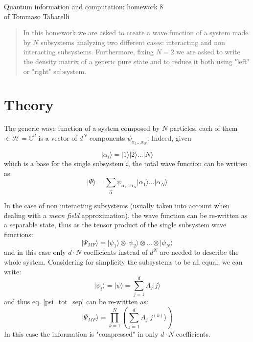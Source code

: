 \documentclass[12pt, a4paper, notitlepage]{report}
\begin{document}
\begin{center}
	\LARGE{Quantum information and computation: homework 8}\\
	\Large{of Tommaso Tabarelli}
\end{center}


\begin{abstract}
	In this homework we are asked to create a wave function of a system made by $N$ subsystems analyzing two different cases: interacting and non interacting subsystems.
	Furthermore, fixing $N=2$ we are asked to write the density matrix of a generic pure state and to reduce it both using "left" or "right" subsystem.
	
\end{abstract}

\section*{Theory}

The generic wave function of a system composed by $N$ particles, each of them $\in \mathcal{H} = \mathbb{C}^d$ is a vector of $d^N$ components $\psi_{\alpha_1 ... \alpha_N}$. Indeed, given

\begin{equation}
\lvert \alpha_i \rangle = \lvert 1 \rangle \lvert 2 \rangle ... \lvert N \rangle
\end{equation}
which is a base for the single subsystem $i$, the total wave function can be written as:
\begin{equation}
	\lvert \Psi \rangle = \sum_{\vec{\alpha}} \psi_{\alpha_1 ... \alpha_N} \lvert \alpha_1 \rangle ... \lvert \alpha_N \rangle
\end{equation}

In the case of non interacting subsystems (usually taken into account when dealing with a \textit{mean field} approximation), the wave function can be re-written as a separable state, thus as the tensor product of the single subsystem wave functions:
\begin{equation} \label{psi_tot_sep}
\lvert \Psi_{MF} \rangle = \lvert \psi_1 \rangle \otimes \lvert \psi_2 \rangle \otimes ... \otimes \lvert \psi_N \rangle
\end{equation}
and in this case only $d \cdot N$ coefficients instead of $d^N$ are needed to describe the whole system. Considering for simplicity the subsystems to be all equal, we can write:
\begin{equation}
\lvert \psi_i \rangle = \lvert \psi \rangle = \sum_{j=1}^{d} A_j \lvert j \rangle
\end{equation}
and thus eq. \ref{psi_tot_sep} can be re-written as:
\begin{equation}
\lvert \Psi_{MF} \rangle = \prod_{k=1}^{N} \left( \sum_{j=1}^{d} A_j \lvert j^{(k)} \rangle \right)
\end{equation}
In this case the information is "compressed" in only $d \cdot N$ coefficients.
\end{document}
